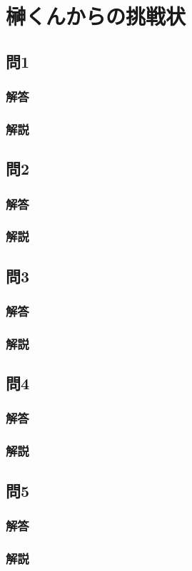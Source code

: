 \section{榊くんからの挑戦状}
\subsection{問1}
\subsubsection{解答}

\subsubsection{解説}


\subsection{問2}
\subsubsection{解答}

\subsubsection{解説}


\subsection{問3}
\subsubsection{解答}

\subsubsection{解説}


\subsection{問4}
\subsubsection{解答}

\subsubsection{解説}


\subsection{問5}
\subsubsection{解答}

\subsubsection{解説}

